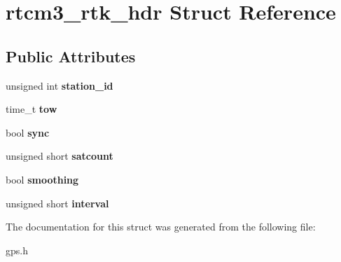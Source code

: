 \hypertarget{structrtcm3__rtk__hdr}{\section{rtcm3\-\_\-rtk\-\_\-hdr \-Struct \-Reference}
\label{structrtcm3__rtk__hdr}
}
\subsection*{\-Public \-Attributes}
\begin{DoxyCompactItemize}
\item 
\hypertarget{structrtcm3__rtk__hdr_af1aec2010ea979a50297305ba0e2ef79}{unsigned int {\bfseries station\-\_\-id}}\label{structrtcm3__rtk__hdr_af1aec2010ea979a50297305ba0e2ef79}

\item 
\hypertarget{structrtcm3__rtk__hdr_a69f22000fca4254cd25a39637c727e5b}{time\-\_\-t {\bfseries tow}}\label{structrtcm3__rtk__hdr_a69f22000fca4254cd25a39637c727e5b}

\item 
\hypertarget{structrtcm3__rtk__hdr_a53958bb13d0059964ddf28db55486ab6}{bool {\bfseries sync}}\label{structrtcm3__rtk__hdr_a53958bb13d0059964ddf28db55486ab6}

\item 
\hypertarget{structrtcm3__rtk__hdr_a6c37cb20fb24550d3e0f1e5ff8b7a5d8}{unsigned short {\bfseries satcount}}\label{structrtcm3__rtk__hdr_a6c37cb20fb24550d3e0f1e5ff8b7a5d8}

\item 
\hypertarget{structrtcm3__rtk__hdr_a37bc1137858a6f96e2d242793eeb7292}{bool {\bfseries smoothing}}\label{structrtcm3__rtk__hdr_a37bc1137858a6f96e2d242793eeb7292}

\item 
\hypertarget{structrtcm3__rtk__hdr_af4c3b3798f87a4f023f864a956548889}{unsigned short {\bfseries interval}}\label{structrtcm3__rtk__hdr_af4c3b3798f87a4f023f864a956548889}

\end{DoxyCompactItemize}


\-The documentation for this struct was generated from the following file\-:\begin{DoxyCompactItemize}
\item 
gps.\-h\end{DoxyCompactItemize}

